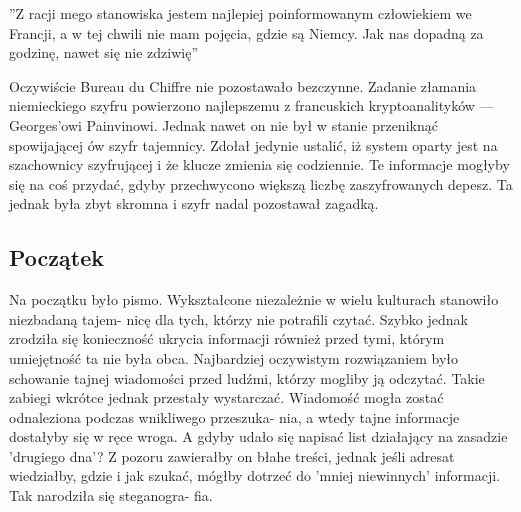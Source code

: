 \documentclass[a4paper]{article}
\begin{document}
\begin{center}
”Z racji mego stanowiska jestem najlepiej poinformowanym człowiekiem we Francji, a w tej chwili
nie mam pojęcia, gdzie są Niemcy. Jak nas dopadną za godzinę, nawet się nie zdziwię”\cite{odwol1}
\end{center}

Oczywiście Bureau du Chiffre nie pozostawało bezczynne. Zadanie złamania niemieckiego szyfru
powierzono najlepszemu z francuskich kryptoanalityków — Georges’owi Painvinowi. Jednak nawet
on nie był w stanie przeniknąć spowijającej ów szyfr tajemnicy. Zdołał jedynie ustalić, iż system
oparty jest na szachownicy szyfrującej i że klucze zmienia się codziennie. Te informacje mogłyby się
na coś przydać, gdyby przechwycono większą liczbę zaszyfrowanych depesz. Ta jednak była zbyt
skromna i szyfr nadal pozostawał zagadką.
\subsection{Początek}
Na początku było pismo. Wykształcone niezależnie w wielu kulturach stanowiło niezbadaną tajem-
nicę dla tych, którzy nie potrafili czytać. Szybko jednak zrodziła się konieczność ukrycia informacji
również przed tymi, którym umiejętność ta nie była obca. Najbardziej oczywistym rozwiązaniem
było schowanie tajnej wiadomości przed ludźmi, którzy mogliby ją odczytać. Takie zabiegi wkrótce
jednak przestały wystarczać. Wiadomość mogła zostać odnaleziona podczas wnikliwego przeszuka-
nia, a wtedy tajne informacje dostałyby się w ręce wroga. A gdyby udało się napisać list działający
na zasadzie ’drugiego dna’? Z pozoru zawierałby on błahe treści, jednak jeśli adresat wiedziałby,
gdzie i jak szukać, mógłby dotrzeć do ’mniej niewinnych’ informacji. Tak narodziła się steganogra-
fia.
\end{document}
